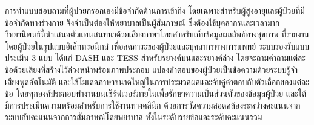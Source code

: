 \begin{thaiabstract}
การทำแบบสอบถามที่ผู้ป่วยกรอกเองมีข้อจำกัดด้านการเข้าถึง โดยเฉพาะสำหรับผู้สูงอายุและผู้ป่วยที่มีข้อจำกัดทางร่างกาย 
จึงจำเป็นต้องให้พยาบาลเป็นผู้สัมภาษณ์ ซึ่งต้องใช้บุคลากรและเวลามาก
วิทยานิพนธ์นี้นำเสนอตัวแทนสนทนาด้วยเสียงภาษาไทยสำหรับเก็บข้อมูลผลลัพธ์ทางสุขภาพ
ที่รายงานโดยผู้ป่วยในรูปแบบอิเล็กทรอนิกส์
เพื่อลดภาระของผู้ป่วยและบุคลากรทางการแพทย์
ระบบรองรับแบบประเมิน 3 แบบ ได้แก่ DASH และ TESS สำหรับรยางค์บนและรยางค์ล่าง
โดยจะถามคำถามแต่ละข้อด้วยเสียงที่สร้างไว้ล่วงหน้าพร้อมภาพประกอบ
แปลงคำตอบของผู้ป่วยเป็นข้อความด้วยระบบรู้จำเสียงพูดอัตโนมัติ
และใช้โมเดลภาษาขนาดใหญ่ในการประมวลผลและจับคู่คำตอบกับตัวเลือกของแต่ละข้อ
โดยทุกองค์ประกอบทำงานบนเซิร์ฟเวอร์ภายในเพื่อรักษาความเป็นส่วนตัวของข้อมูลผู้ป่วย
และได้มีการประเมินความพร้อมสำหรับการใช้งานทางคลินิก 
ด้วยการวัดความสอดคล้องระหว่างคะแนนจากระบบกับคะแนนจากการสัมภาษณ์โดยพยาบาล ทั้งในระดับรายข้อและระดับคะแนนรวม

\end{thaiabstract}
